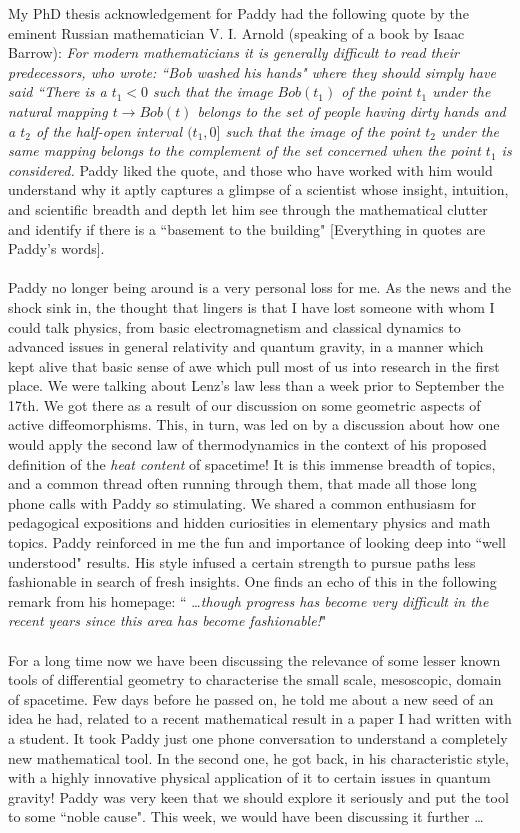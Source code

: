 \documentclass[prd, preprint, longbibliography, 12pt]{revtex4-2}
\begin{document}
\noindent My PhD thesis acknowledgement for Paddy had the following quote by the eminent Russian mathematician V. I. Arnold (speaking of a book by Isaac Barrow): \textit{For modern mathematicians it is generally difficult to read their predecessors, who wrote: “Bob washed his hands" where they should simply have said “There is a $t_1 < 0$ such that the image $Bob(t_1)$ of the point $t_1$ under the natural mapping $t \to Bob(t)$ belongs to the set of people having dirty hands and a $t_2$ of the half-open interval $(t_1, 0]$ such that the image of the point $t_2$ under the same mapping belongs to the complement of the set concerned when the point $t_1$ is considered.} Paddy liked the quote, and those who have worked with him would understand why it aptly captures a glimpse of a scientist whose insight, intuition, and scientific breadth and depth let him see through the mathematical clutter and identify if there is a ``basement to the building" [Everything in quotes are Paddy's words].
\\
\\
Paddy no longer being around is a very personal loss for me. As the news and the shock sink in, the thought that lingers is that I have lost someone with whom I could talk physics, from basic electromagnetism and classical dynamics to advanced issues in general relativity and quantum gravity, in a manner which kept alive that basic sense of awe which pull most of us into research in the first place. We were talking about Lenz's law less than a week prior to September the 17th. We got there as a result of our discussion on some geometric aspects of active diffeomorphisms. This, in turn, was led on by a discussion about how one would apply the second law of thermodynamics in the context of his proposed definition of the {\it heat content} of spacetime! It is this immense breadth of topics, and a common thread often running through them, that made all those long phone calls with Paddy so stimulating. We shared a common enthusiasm for pedagogical expositions and hidden curiosities in elementary physics and math topics. Paddy reinforced in me the fun and importance of looking deep into ``well understood" results. His style infused a certain strength to pursue paths less fashionable in search of fresh insights. One finds an echo of this in the following remark from his homepage: `` \ldots \textit{though progress has become very difficult in the recent years since this area has become fashionable!}" 
\\
\\
For a long time now we have been discussing the relevance of some lesser known tools of differential geometry to characterise the small scale, mesoscopic, domain of spacetime. Few days before he passed on, he told me about a new seed of an idea he had, related to a recent mathematical result in a paper I had written with a student. It took Paddy just one phone conversation to understand a completely new mathematical tool. In the second one, he got back, in his characteristic style, with a highly innovative physical application of it to certain issues in quantum gravity! Paddy was very keen that we should explore it seriously and put the tool to some ``noble cause". This week, we would have been discussing it further \ldots
\end{document}
